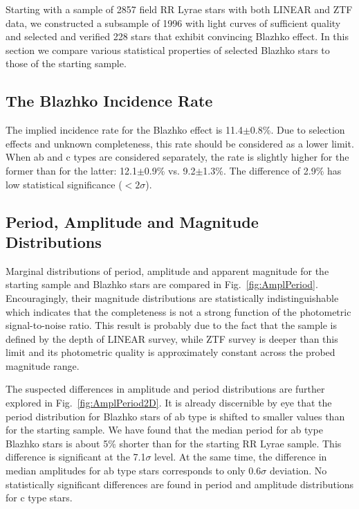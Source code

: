 Starting with a sample of 2857 field RR Lyrae stars with both LINEAR and ZTF data, we constructed a subsample of
1996 with light curves of sufficient quality and selected and verified 228 stars that exhibit convincing Blazhko effect.
In this section we compare various statistical properties of selected Blazhko stars to those of the starting sample. 

\subsection{The Blazhko Incidence Rate}

The implied incidence rate for the Blazhko effect is
11.4$\pm$0.8\%. Due to selection effects and unknown completeness,
this rate should be considered as a lower limit. 
When ab and c types are considered separately, the
rate is slightly higher for the former than for the latter: 12.1$\pm$0.9\%
vs. 9.2$\pm$1.3\%.  The difference of 2.9\% has low statistical significance ($<2\sigma$). 


\subsection{Period, Amplitude and Magnitude Distributions}

 
Marginal distributions of  period, amplitude and apparent magnitude
for the starting sample and Blazhko stars are compared in Fig.~\ref{fig:AmplPeriod}. 
Encouragingly, their magnitude distributions are statistically
indistinguishable which indicates that the completeness is not a
strong function of the photometric signal-to-noise ratio. This
result is probably due to the fact that the sample is defined by the
depth of LINEAR survey, while ZTF survey is deeper than this limit and
its photometric quality is approximately constant across the probed
magnitude range. 

The suspected differences in amplitude and period distributions are
further explored in Fig.~\ref{fig:AmplPeriod2D}. It is already
discernible by eye that the period distribution for Blazhko stars of
ab type is shifted to smaller values than for the starting sample. We have
found that the median period for ab type Blazhko stars is about 5\% shorter
than for the starting RR Lyrae sample. This difference is significant at
the 7.1$\sigma$ level.  At the same time, the difference in median
amplitudes for ab type stars corresponds to only 0.6$\sigma$ deviation. 
No statistically significant differences are found in period and
amplitude distributions for c type stars.

